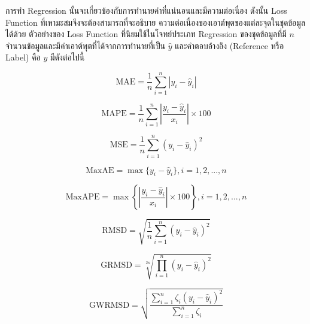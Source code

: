 การทำ Regression นั้นจะเกี่ยวข้องกับการทำนายค่าที่แน่นอนและมีความต่อเนื่อง ดังนั้น Loss Function ที่เหามะสมจึงจะต้องสามารถที่จะอธิบาย%
ความต่อเนื่องของเอาต์พุตของแต่ละจุดในชุดข้อมูลได้ด้วย ตัวอย่างของ Loss Function ที่นิยมใช้ในโจทย์ประเภท Regression ของชุดข้อมูลที่มี 
$n$ จำนวนข้อมูลและมีค่าเอาต์พุตที่ได้จากการทำนายที่เป็น $\hat{y}$ และคำตอบอ้างอิง (Reference หรือ Label) คือ $y$ มีดังต่อไปนี้

\begin{equation}\label{eq:mae}
    \text{MAE} = \frac{1}{n} \sum_{i=1}^{n} | y_{i} - \hat{y}_{i} |
\end{equation}

\begin{equation}\label{eq:mape}
    \text{MAPE} = \frac{1}{n} \sum_{i=1}^{n} \left| \frac{y_{i} - \hat{y}_{i}}{x_{i}} \right| \times 100
\end{equation}

\begin{equation}\label{eq:mse}
    \text{MSE} = \frac{1}{n} \sum_{i=1}^{n} \left( y_{i} - \hat{y}_{i} \right)^2
\end{equation}

\begin{equation}\label{eq:maxae}
    \text{MaxAE} = \max\{y_{i} - \hat{y}_{i}\}, i = 1, 2, ..., n
\end{equation}

\begin{equation}\label{eq:maxape}
    \text{MaxAPE} = \max\left\{\left| \frac{y_{i} - \hat{y}_{i}}{x_{i}} \right| \times 100 \right\}, i = 1, 2, 
    ..., n
\end{equation}

\begin{equation}\label{eq:rmsd}
    \text{RMSD} = \sqrt{ \frac{1}{n} \sum_{i=1}^{n} (y_{i} - \hat{y}_{i})^{2} }
\end{equation}

\begin{equation}\label{eq:grmsd}
    \text{GRMSD} = \sqrt[2n]{ \prod_{i=1}^{n} (y_{i} - \hat{y}_{i})^{2} }
\end{equation}

\begin{equation}\label{eq:gwrmsd}
    \text{GWRMSD} = \sqrt{\frac{\sum_{i=1}^{n} \zeta_{i} (y_{i} - \hat{y}_{i})^{2}}{\sum_{i=1}^{n} \zeta_{i}}}
\end{equation}


